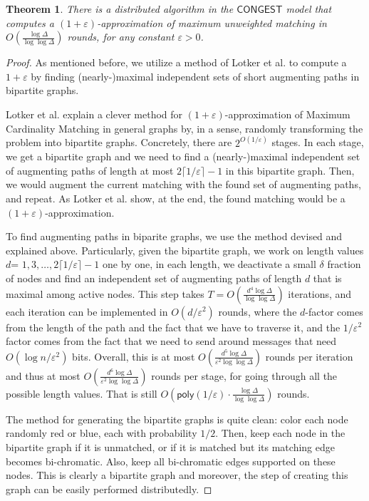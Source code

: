 \documentclass[11pt]{article}
\newtheorem{theorem}{Theorem}[section]
\newcommand{\eps}{\varepsilon}
\begin{document}
\begin{theorem} \label{thm:MCM1CONGEST} There is a distributed algorithm in the $\mathsf{CONGEST}$ model that computes a $(1+\eps)$-approximation of maximum unweighted matching in $O(\frac{\log\Delta} {\log\log \Delta})$ rounds, for any constant $\eps>0$.
\end{theorem}
\begin{proof}
As mentioned before, we utilize a method of Lotker et al.\cite{lotkerMatchingImproved} to compute a $1+\eps$ by finding (nearly-)maximal independent sets of short augmenting paths in bipartite graphs.

Lotker et al.\cite{lotkerMatchingImproved} explain a clever method for $(1+\eps)$-approximation of Maximum Cardinality Matching in general graphs by, in a sense, randomly transforming the problem into bipartite graphs. Concretely, there are $2^{O(1/\eps)}$ stages. In each stage, we get a bipartite graph and we need to find a (nearly-)maximal independent set of augmenting paths of length at most $2\lceil{1/\eps}\rceil-1$ in this bipartite graph. Then, we would augment the current matching with the found set of augmenting paths, and repeat. As Lotker et al. show, at the end, the found matching would be a $(1+\eps)$-approximation.



To find augmenting paths in biparite graphs, we use the method devised and explained above. Particularly, given the bipartite graph, we work on length values $d$= $1, 3, \dots, 2\lceil{1/\eps}\rceil-1$ one by one, in each length, we deactivate a small $\delta$ fraction of nodes and find an independent set of augmenting paths of length $d$ that is maximal among active nodes. This step takes $T=O(\frac{d^4\log \Delta}{\log\log \Delta})$ iterations, and each iteration can be implemented in $O(d/\eps^2)$ rounds, where the $d$-factor comes from the length of the path and the fact that we have to traverse it, and the $1/\eps^2$ factor comes from the fact that we need to send around messages that need $O(\log n/\eps^2)$ bits. Overall, this is at most $O(\frac{d^5\log \Delta}{\eps^2\log\log \Delta})$ rounds per iteration and thus at most $O(\frac{d^6\log \Delta}{\eps^2\log\log \Delta})$ rounds per stage, for going through all the possible length values. That is still $O(\mathsf{poly}(1/\eps) \cdot \frac{\log \Delta}{\log\log \Delta})$ rounds.

The method for generating the bipartite graphs is quite clean: color each node randomly red or blue, each with probability $1/2$. Then, keep each node in the bipartite graph if it is unmatched, or if it is matched but its matching edge becomes bi-chromatic. Also, keep all bi-chromatic edges supported on these nodes. This is clearly a bipartite graph and moreover, the step of creating this graph can be easily performed distributedly.


\end{proof}
\end{document}
